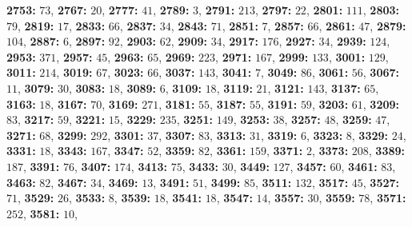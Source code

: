 \textsf{\bfseries 2753:} $73$, \textsf{\bfseries 2767:} $20$, \textsf{\bfseries 2777:} $41$, \textsf{\bfseries 2789:} $3$, \textsf{\bfseries 2791:} $213$, \textsf{\bfseries 2797:} $22$, \textsf{\bfseries 2801:} $111$, \textsf{\bfseries 2803:} $79$, \textsf{\bfseries 2819:} $17$, \textsf{\bfseries 2833:} $66$, \textsf{\bfseries 2837:} $34$, \textsf{\bfseries 2843:} $71$, \textsf{\bfseries 2851:} $7$, \textsf{\bfseries 2857:} $66$, \textsf{\bfseries 2861:} $47$, \textsf{\bfseries 2879:} $104$, \textsf{\bfseries 2887:} $6$, \textsf{\bfseries 2897:} $92$, \textsf{\bfseries 2903:} $62$, \textsf{\bfseries 2909:} $34$, \textsf{\bfseries 2917:} $176$, \textsf{\bfseries 2927:} $34$, \textsf{\bfseries 2939:} $124$, \textsf{\bfseries 2953:} $371$, \textsf{\bfseries 2957:} $45$, \textsf{\bfseries 2963:} $65$, \textsf{\bfseries 2969:} $223$, \textsf{\bfseries 2971:} $167$, \textsf{\bfseries 2999:} $133$, \textsf{\bfseries 3001:} $129$, \textsf{\bfseries 3011:} $214$, \textsf{\bfseries 3019:} $67$, \textsf{\bfseries 3023:} $66$, \textsf{\bfseries 3037:} $143$, \textsf{\bfseries 3041:} $7$, \textsf{\bfseries 3049:} $86$, \textsf{\bfseries 3061:} $56$, \textsf{\bfseries 3067:} $11$, \textsf{\bfseries 3079:} $30$, \textsf{\bfseries 3083:} $18$, \textsf{\bfseries 3089:} $6$, \textsf{\bfseries 3109:} $18$, \textsf{\bfseries 3119:} $21$, \textsf{\bfseries 3121:} $143$, \textsf{\bfseries 3137:} $65$, \textsf{\bfseries 3163:} $18$, \textsf{\bfseries 3167:} $70$, \textsf{\bfseries 3169:} $271$, \textsf{\bfseries 3181:} $55$, \textsf{\bfseries 3187:} $55$, \textsf{\bfseries 3191:} $59$, \textsf{\bfseries 3203:} $61$, \textsf{\bfseries 3209:} $83$, \textsf{\bfseries 3217:} $59$, \textsf{\bfseries 3221:} $15$, \textsf{\bfseries 3229:} $235$, \textsf{\bfseries 3251:} $149$, \textsf{\bfseries 3253:} $38$, \textsf{\bfseries 3257:} $48$, \textsf{\bfseries 3259:} $47$, \textsf{\bfseries 3271:} $68$, \textsf{\bfseries 3299:} $292$, \textsf{\bfseries 3301:} $37$, \textsf{\bfseries 3307:} $83$, \textsf{\bfseries 3313:} $31$, \textsf{\bfseries 3319:} $6$, \textsf{\bfseries 3323:} $8$, \textsf{\bfseries 3329:} $24$, \textsf{\bfseries 3331:} $18$, \textsf{\bfseries 3343:} $167$, \textsf{\bfseries 3347:} $52$, \textsf{\bfseries 3359:} $82$, \textsf{\bfseries 3361:} $159$, \textsf{\bfseries 3371:} $2$, \textsf{\bfseries 3373:} $208$, \textsf{\bfseries 3389:} $187$, \textsf{\bfseries 3391:} $76$, \textsf{\bfseries 3407:} $174$, \textsf{\bfseries 3413:} $75$, \textsf{\bfseries 3433:} $30$, \textsf{\bfseries 3449:} $127$, \textsf{\bfseries 3457:} $60$, \textsf{\bfseries 3461:} $83$, \textsf{\bfseries 3463:} $82$, \textsf{\bfseries 3467:} $34$, \textsf{\bfseries 3469:} $13$, \textsf{\bfseries 3491:} $51$, \textsf{\bfseries 3499:} $85$, \textsf{\bfseries 3511:} $132$, \textsf{\bfseries 3517:} $45$, \textsf{\bfseries 3527:} $71$, \textsf{\bfseries 3529:} $26$, \textsf{\bfseries 3533:} $8$, \textsf{\bfseries 3539:} $18$, \textsf{\bfseries 3541:} $18$, \textsf{\bfseries 3547:} $14$, \textsf{\bfseries 3557:} $30$, \textsf{\bfseries 3559:} $78$, \textsf{\bfseries 3571:} $252$, \textsf{\bfseries 3581:} $10$, 
